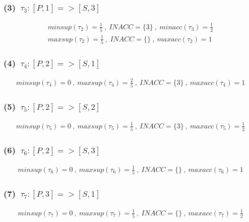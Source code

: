 \documentclass[a4paper,12pt]{jarticle}
\begin{document}
\subsubsection*{(3)~$\tau_3:[P,1]=>[S,3]$}
\vspace{-4mm}
%
\begin{align*}
 minsup(\tau_2)=\frac{1}{5}~,~INACC=\{3\}~,~minacc(\tau_3)=\frac{1}{2}\\
 maxsup(\tau_2)=\frac{1}{5}~,~INACC=\{\}~,~maxacc(\tau_2)=1
\end{align*}
%
\vspace{-10mm}
\subsubsection*{(4)~$\tau_4:[P,2]=>[S,1]$}
\vspace{-4mm}
%
\begin{align*}
 minsup(\tau_4)=0~,~maxsup(\tau_4)=\frac{2}{5}~,~INACC=\{3\}~,~maxacc(\tau_4)=1
\end{align*}
%
\vspace{-10mm}
\subsubsection*{(5)~$\tau_5:[P,2]=>[S,2]$}
\vspace{-4mm}
%
\begin{align*}
 minsup(\tau_5)=0~,~maxsup(\tau_5)=\frac{1}{5}~,~INACC=\{3\}~,~maxacc(\tau_5)=\frac{1}{2}
\end{align*}
%
\vspace{-10mm}
\subsubsection*{(6)~$\tau_6:[P,2]=>[S,3]$}
\vspace{-4mm}
%
\begin{align*}
 minsup(\tau_6)=0~,~maxsup(\tau_6)=\frac{1}{5}~,~INACC=\{\}~,~maxacc(\tau_6)=1
\end{align*}
%
\vspace{-10mm}
\subsubsection*{(7)~$\tau_7:[P,3]=>[S,1]$}
\vspace{-4mm}
%
\begin{align*}
 minsup(\tau_7)=0~,~maxsup(\tau_7)=\frac{1}{5}~,~INACC=\{\}~,~maxacc(\tau_7)=\frac{1}{2}
\end{align*}
%
\vspace{-10mm}
\end{document}
